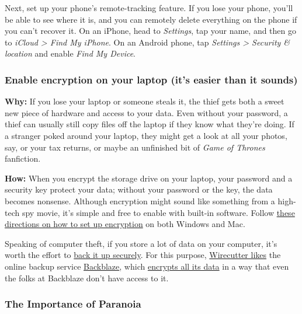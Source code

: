 Next, set up your phone's remote-tracking feature. If you lose your
phone, you'll be able to see where it is, and you can remotely delete
everything on the phone if you can't recover it. On an iPhone, head to
\emph{Settings}, tap your name, and then go to \emph{iCloud
\textgreater{} Find My iPhone}. On an Android phone, tap \emph{Settings
\textgreater{} Security \& location} and enable \emph{Find My Device}.~

\hypertarget{enable-encryption-on-your-laptop-its-easier-than-it-sounds}{%
\subsubsection{Enable encryption on your laptop (it's easier than it
sounds)}\label{enable-encryption-on-your-laptop-its-easier-than-it-sounds}}

\textbf{Why:} If you lose your laptop or someone steals it, the thief
gets both a sweet new piece of hardware and access to your data. Even
without your password, a thief can usually still copy files off the
laptop if they know what they're doing. If a stranger poked around your
laptop, they might get a look at all your photos, say, or your tax
returns, or maybe an unfinished bit of \emph{Game of Thrones}
fanfiction.~

\textbf{How:} When you encrypt the storage drive on your laptop, your
password and a security key protect your data; without your password or
the key, the data becomes nonsense. Although encryption might sound like
something from a high-tech spy movie, it's simple and free to enable
with built-in software. Follow
\href{https://www.nytimes.com/2018/03/13/smarter-living/how-to-encrypt-your-computers-data.html}{these
directions on how to set up encryption} on both Windows and Mac.~

Speaking of computer theft, if you store a lot of data on your computer,
it's worth the effort to
\href{https://thewirecutter.com/reviews/how-to-back-up-your-computer/}{back
it up securely}. For this purpose,
\href{https://thewirecutter.com/reviews/best-online-backup-service/}{Wirecutter
likes} the online backup service
\href{https://www.backblaze.com/cloud-backup.html}{Backblaze}, which
\href{https://www.backblaze.com/backup-encryption.html}{encrypts all its
data} in a way that even the folks at Backblaze don't have access to
it.~

\hypertarget{the-importance-of-paranoia}{%
\subsubsection{The Importance of
Paranoia}\label{the-importance-of-paranoia}}

